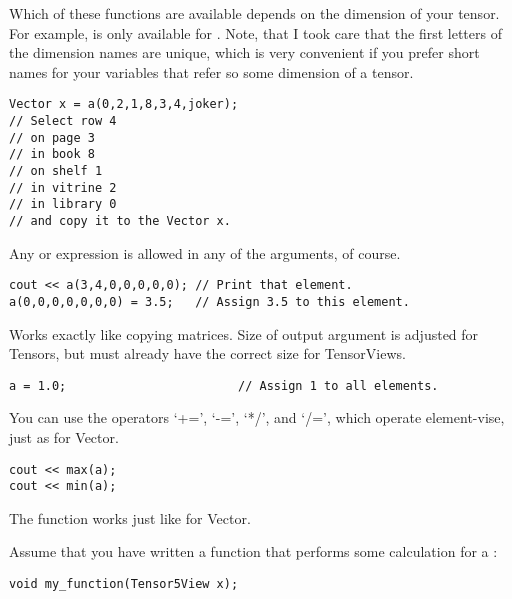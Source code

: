 Which of these functions are available depends on the dimension of
your tensor. For example,  is only available for
. Note, that I took care that the first letters of the
dimension names are unique, which is very convenient if you prefer short
names for your variables that refer so some dimension of a tensor.

\begin{verbatim}
Vector x = a(0,2,1,8,3,4,joker);
// Select row 4
// on page 3 
// in book 8
// on shelf 1 
// in vitrine 2 
// in library 0
// and copy it to the Vector x.
\end{verbatim}

Any  or  expression is allowed in any of the
arguments, of course.

\begin{verbatim}
cout << a(3,4,0,0,0,0,0); // Print that element.
a(0,0,0,0,0,0,0) = 3.5;   // Assign 3.5 to this element.
\end{verbatim}


Works exactly like copying matrices. Size of output argument is
adjusted for Tensors, but must already have the correct size for
TensorViews.

\begin{verbatim}
a = 1.0;                        // Assign 1 to all elements.
\end{verbatim}


You can use the operators `+=', `-=', `*/', and `/=', which operate
element-vise, just as for Vector.

\begin{verbatim}
cout << max(a);
cout << min(a);
\end{verbatim}


The function  works just like for Vector.


Assume that you have written a function that performs some calculation
for a :
\begin{verbatim}
void my_function(Tensor5View x);
\end{verbatim}

